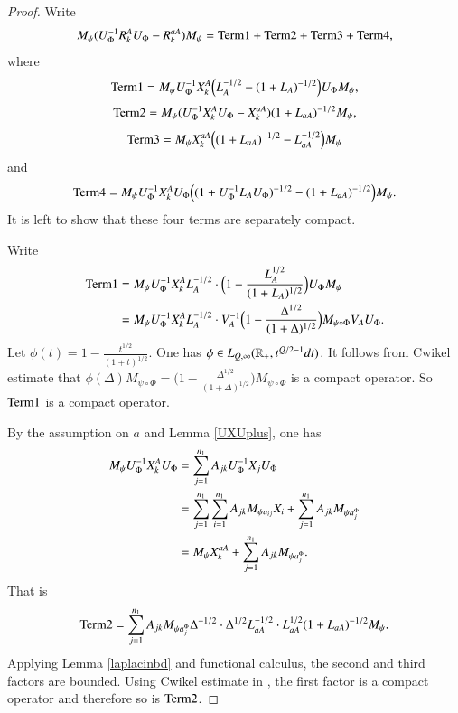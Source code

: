 \documentclass[leqno]{amsart}
\begin{document}
	\begin{proof}
		Write
		\begin{align*}
			M_{\psi}(U_{\Phi}^{-1} { R}^{A}_{k}U_{\Phi}-{ R}^{aA}_{k})M_{\psi}={\rm Term1}+{\rm Term2}+{\rm Term3}+{\rm Term4},
		\end{align*}
		where
		$${\rm Term1}=M_{\psi}U_{\Phi}^{-1} X_{k}^{A}\Big(L_{A}^{-1/2}-(1+L_{A})^{-1/2}\Big)U_{\Phi}M_{\psi},$$
		$${\rm Term2}=M_{\psi}(U_{\Phi}^{-1} X_{k}^{A}U_{\Phi}- X_{k}^{aA})(1+L_{aA})^{-1/2}M_{\psi},$$
		$${\rm Term3}=M_{\psi} X_{k}^{aA}\Big((1+L_{aA})^{-1/2}-L_{aA}^{-1/2}\Big)M_{\psi}$$
		and
		$${\rm Term4}=M_{\psi}U_{\Phi}^{-1} X_{k}^{A}U_{\Phi}\Big((1+U_{\Phi}^{-1} L_{A} U_{\Phi})^{-1/2}-(1+ L_{aA})^{-1/2}\Big)M_{\psi}.$$
		It is left to show that these four terms are separately compact.
		
		Write
		\begin{align*}
			{\rm Term1}
			&=M_{\psi}U_{\Phi}^{-1} X_{k}^{A}L_{A}^{-1/2}\cdot\Big(1-\frac{L_{A}^{1/2}}{(1+L_{A})^{1/2}}\Big)U_{\Phi}M_{\psi}\\
			&=M_{\psi}U_{\Phi}^{-1} X_{k}^{A}L_{A}^{-1/2}\cdot V_{A}^{-1}\Big(1-\frac{\Delta^{1/2}}{(1+\Delta)^{1/2}}\Big)M_{\psi\circ\Phi}V_{A}U_{\Phi}.
		\end{align*}
		Let $\phi(t)=1-\frac{t^{1/2}}{(1+t)^{1/2}}$. 
		One has $\phi\in L_{Q,\infty}(\mathbb{R}_{+},t^{Q/2-1}dt)$. 
		It follows from Cwikel estimate \cite[Corollary 4.5]{MSZ-Cwikel} that $\phi(\Delta)M_{\psi\circ\Phi}=\Big(1-\frac{\Delta^{1/2}}{(1+\Delta)^{1/2}}\Big)M_{\psi\circ\Phi}$ is a compact operator. %
		So ${\rm Term1}$ is a compact operator.
		
		By the assumption on $a$ and Lemma \ref{UXUplus}, one has
		\begin{align*}
			M_{\psi}U_{\Phi}^{-1} X_{k}^{A}U_{\Phi}
			&=\sum_{j=1}^{n_{1}}A_{jk}U_{\Phi}^{-1} X_{j}U_{\Phi}\\
			&=\sum_{j=1}^{n_{1}}\sum_{i=1}^{n_{1}}A_{jk}M_{\psi a_{ij}}X_{i}
			+\sum_{j=1}^{n_{1}}A_{jk}M_{\psi a_{j}^{\Phi}}\\
			&=M_{\psi}X_{k}^{aA}+\sum_{j=1}^{n_{1}}A_{jk}M_{\psi a_{j}^{\Phi}}.
		\end{align*}
		That is
		\begin{align*}
			{\rm Term2}=
			\sum_{j=1}^{n_{1}}A_{jk}M_{\psi a_{j}^{\Phi}}\Delta^{-1/2}
			\cdot\Delta^{1/2} L_{aA}^{-1/2}
			\cdot L_{aA}^{1/2}(1+ L_{aA})^{-1/2}M_{\psi}.
		\end{align*}
		Applying Lemma \ref{laplacinbd} and functional calculus, the second and third factors are bounded.
		Using Cwikel estimate in \cite{MSZ-Cwikel}, the first factor is a compact operator and therefore so is ${\rm Term2}$.
		

\end{proof}
\end{document}

